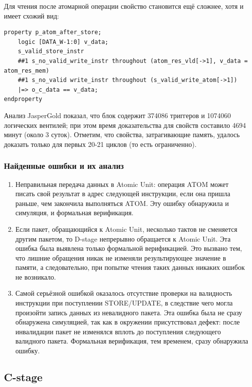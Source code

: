 Для чтения после атомарной операции свойство становится ещё сложнее, хотя и имеет схожий вид: 

\begin{lstlisting}
property p_atom_after_store;
    logic [DATA_W-1:0] v_data;
    s_valid_store_instr 
    ##1 s_no_valid_write_instr throughout (atom_res_vld[->1], v_data = atom_res_mem)
    ##1 s_no_valid write_instr throughout (s_valid_write_atom[->1])
    |=> o_c_data == v_data;
endproperty
\end{lstlisting}

Анализ JasperGold показал, что блок содержит 374086 триггеров и 1074060 логических вентилей; при этом время доказательства для свойств составило 4694 минут (около 3 суток). Отметим, что свойства, затрагивающие память, удалось доказать только для первых 20-21 циклов (то есть ограниченно).

\subsubsection*{Найденные ошибки и их анализ}

\begin{enumerate}
    \item Неправильная передача данных в Atomic Unit: операция ATOM может писать свой результат в адрес следующей инструкции, если она пришла раньше, чем закончила выполняться ATOM. Эту ошибку обнаружила и симуляция, и формальная верификация.  %
    \item Если пакет, обращающийся к Atomic Unit, несколько тактов не сменяется другим пакетом, то D-stage непрерывно обращается к Atomic Unit. Эта ошибка была выявлена только формальной верификацией. Это вызвано тем, что лишние обращения никак не изменяли результирующее значение в памяти, а следовательно, при попытке чтения таких данных никаких ошибок не возникало. %
    \item Самой серьёзной ошибкой оказалось отсутствие проверки на валидность инструкции при поступлении STORE/UPDATE, в следствие чего могла произойти запись данных из невалидного пакета. Эта ошибка была не сразу обнаружена симуляцией, так как в окружении присутствовал дефект: после инвалидации пакет не изменялся вплоть до поступления следующего валидного пакета. Формальная верификация, тем временем, сразу обнаружила ошибку. %
\end{enumerate}

\subsection{C-stage}

